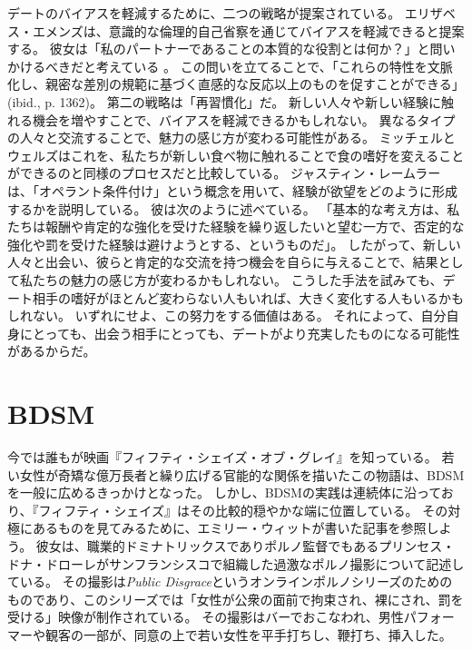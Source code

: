 \documentclass[paper=a4,book,openany]{jlreq}
\newcommand{\ig}[1]{}           %
\begin{document}
デートのバイアスを軽減するために、二つの戦略が提案されている。
エリザベス・エメンズは、意識的な倫理的自己省察を通じてバイアスを軽減できると提案する。
彼女は「私のパートナーであることの本質的な役割とは何か？」と問いかけるべきだと考えている \citep[p. 1360]{emens09:_intim_discr}。
この問いを立てることで、「これらの特性を文脈化し、親密な差別の規範に基づく直感的な反応以上のものを促すことができる」(ibid., p. 1362)。
第二の戦略は「再習慣化」だ。
新しい人々や新しい経験に触れる機会を増やすことで、バイアスを軽減できるかもしれない。
異なるタイプの人々と交流することで、魅力の感じ方が変わる可能性がある。
ミッチェル\ig{Megan Mitchell}とウェルズはこれを、私たちが新しい食べ物に触れることで食の嗜好を変えることができるのと同様のプロセスだと比較している\citep{mitchell18:_race_roman_attrac_datin}。
ジャスティン・レームラーは、「オペラント条件付け」という概念を用いて、経験が欲望をどのように形成するかを説明している。
彼は次のように述べている。
「基本的な考え方は、私たちは報酬や肯定的な強化を受けた経験を繰り返したいと望む一方で、否定的な強化や罰を受けた経験は避けようとする、というものだ」\citep{lehmiller19:_where_do_our_sexual_attrac_come_from}。
したがって、新しい人々と出会い、彼らと肯定的な交流を持つ機会を自らに与えることで、結果として私たちの魅力の感じ方が変わるかもしれない。
こうした手法を試みても、デート相手の嗜好がほとんど変わらない人もいれば、大きく変化する人もいるかもしれない。
いずれにせよ、この努力をする価値はある。
それによって、自分自身にとっても、出会う相手にとっても、デートがより充実したものになる可能性があるからだ。

\section{BDSM}

今では誰もが映画『フィフティ・シェイズ・オブ・グレイ』を知っている。
若い女性が奇矯な億万長者と繰り広げる官能的な関係を描いたこの物語は、BDSMを一般に広めるきっかけとなった。
しかし、BDSMの実践は連続体に沿っており、『フィフティ・シェイズ』はその比較的穏やかな端に位置している。
その対極にあるものを見てみるために、エミリー・ウィットが書いた記事を参照しよう。
彼女は、職業的ドミナトリックスでありポルノ監督でもあるプリンセス・ドナ・ドローレがサンフランシスコで組織した過激なポルノ撮影について記述している。
その撮影は\emph{Public Disgrace}というオンラインポルノシリーズのためのものであり、このシリーズでは「女性が公衆の面前で拘束され、裸にされ、罰を受ける」映像が制作されている。
その撮影はバーでおこなわれ、男性パフォーマーや観客の一部が、同意の上で若い女性を平手打ちし、鞭打ち、挿入した\citep{witt13:_what_do_you_desir}。
\end{document}
